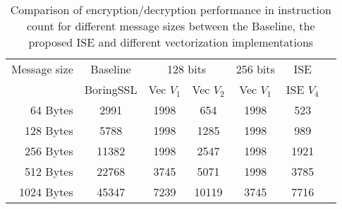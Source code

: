 \begin{table}
\caption{Comparison of encryption/decryption performance in instruction count for different message sizes between the Baseline, the proposed ISE and different vectorization implementations}
\label{tab:res:sw:perf}
\begin{tabular}{rcccccc}
\toprule             
Message size & Baseline  & \multicolumn{2}{c}{128 bits} & 256 bits  &   ISE       \\
             & BoringSSL & Vec $V_1$   &   Vec $V_2$    & Vec $V_1$ &   ISE $V_4$ \\
\midrule
  64 Bytes   &    2991   &    1998     &       654      &    1998   &   523       \\
 128 Bytes   &    5788   &    1998     &      1285      &    1998   &   989       \\
 256 Bytes   &   11382   &    1998     &      2547      &    1998   &  1921       \\
 512 Bytes   &   22768   &    3745     &      5071      &    1998   &  3785       \\
1024 Bytes   &   45347   &    7239     &     10119      &    3745   &  7716       \\
\bottomrule
\end{tabular}
\end{table}

